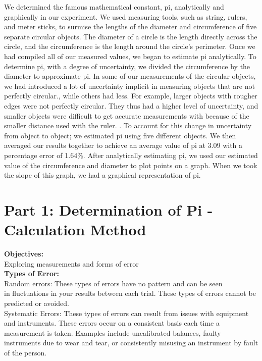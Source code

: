 \documentclass[12pt]{article}
\begin{document}
        We determined the famous mathematical constant, pi, analytically and graphically in our experiment. We used measuring tools, such as string, rulers, and meter sticks, to surmise the lengths of the diameter and circumference of five separate circular objects. The diameter of a circle is the length directly across the circle, and the circumference is the length around the circle's perimeter. Once we had compiled all of our measured values, we began to estimate pi analytically. To determine pi, with a degree of uncertainty, we divided the circumference by the diameter to approximate pi. In some of our measurements of the circular objects, we had introduced a lot of uncertainty implicit in measuring objects that are not perfectly circular., while others had less. For example, larger objects with rougher edges were not perfectly circular. They thus had a higher level of uncertainty, and smaller objects were difficult to get accurate measurements with because of the smaller distance used with the ruler. . To account for this change in uncertainty from object to object; we estimated pi using five different objects. We then averaged our results together to achieve an average value of pi at 3.09 with a percentage error of 1.64\%. After analytically estimating pi, we used our estimated value of the circumference and diameter to plot points on a graph. When we took the slope of this graph, we had a graphical representation of pi.

\pagebreak

\section{Part 1: Determination of Pi - Calculation Method}

    \hspace{6mm}\textbf{Objectives:}
    \\ \hspace{4mm} Exploring measurements and forms of error \\
    
    \textbf{Types of Error:}
    \\ \hspace{4mm} Random errors: These types of errors have no pattern and can be seen \\ in fluctuations in your results between each trial. These types of errors cannot be predicted or avoided.
    \\ \hspace{4mm} Systematic Errors: These types of errors can result from issues with equipment and instruments. These errors occur on a consistent basis each time a measurement is taken. Examples include uncalibrated balances, faulty instruments due to wear and tear, or consistently misusing an instrument by fault of the person. \\
\end{document}
